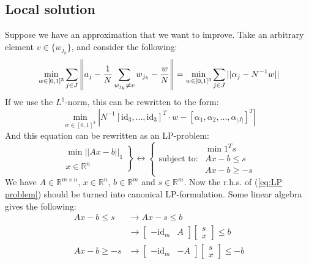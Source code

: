 \documentclass[10pt,a4paper]{article}
\newcommand{\R}{\mathbb{R}}
\newcommand{\id}{\text{id}}
\begin{document}
	\subsection*{Local solution}
	Suppose we have an approximation that we want to improve.
	Take an arbitrary element $v \in \{ w_{j_k} \}$, and consider the following:
	\begin{equation*}
	\min_{w \in [0,1]^3} \sum_{j \in J} \left\lVert a_j - {1 \over N} \sum_{w_{j_k} \neq v} w_{j_k} - {w \over N} \right\rVert = \min_{w \in [0,1]^3} \sum_{j \in J} ||\alpha_j - N^{-1} w||
	\end{equation*}
	If we use the $L^1$-norm, this can be rewritten to the form:
	\begin{equation*}
	\min_{w \in [0,1]^3} |N^{-1}[\id_{3}, ..., \id_{3}]^T \cdot w - [\alpha_1, \alpha_2, ..., \alpha_{|J|}]^T|
	\end{equation*}
	And this equation can be rewritten as an LP-problem:
	\begin{equation}
	\left. \begin{matrix}
	\min ||Ax - b||_1\\
	x \in \R^n
	\end{matrix} \right\} 
	\longleftrightarrow 
	\left\{ \begin{matrix}
	&\min 1^T s\\
	\text{subject to:}& Ax - b \leq s\\
	&Ax-b \geq -s
	\end{matrix}\right.
	\label{eq:LP problem}
	\end{equation}
	We have $A \in \R^{m\times n}$, $x \in \R^n$, $b \in \R^m$ and $s \in \R^m$. 
	Now the r.h.s. of (\ref{eq:LP problem}) should be turned into canonical LP-formulation.
	Some linear algebra gives the following:
	\begin{align*}
	Ax - b \leq s &\longrightarrow Ax - s \leq b \\
	&\longrightarrow \begin{bmatrix}-\id_{m} & A\end{bmatrix} \begin{bmatrix}s\\ x\end{bmatrix} \leq b\\
	Ax - b \geq -s &\longrightarrow \begin{bmatrix}-\id_{m} & -A\end{bmatrix} \begin{bmatrix}s\\ x\end{bmatrix} \leq -b
	\end{align*}
\end{document}
